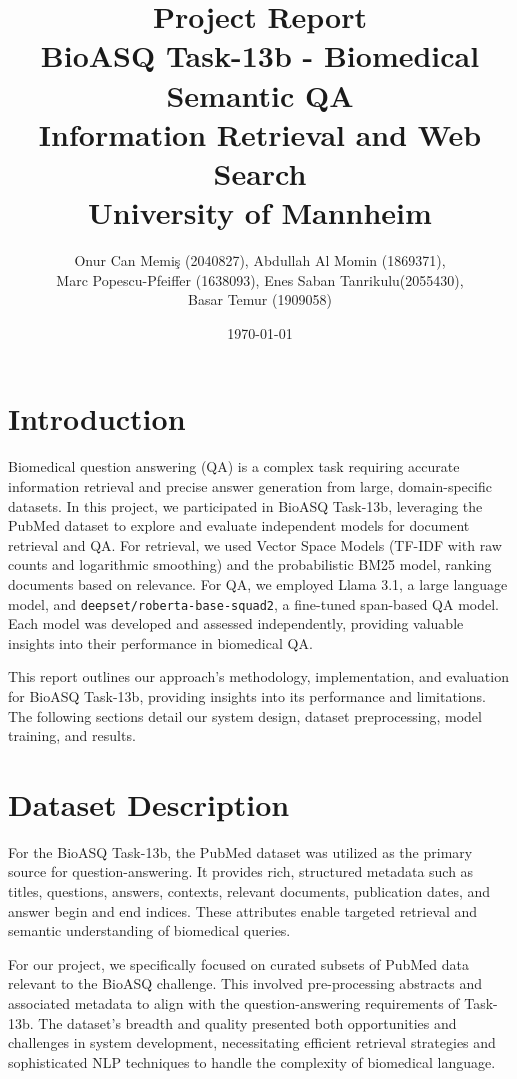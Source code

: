\documentclass{article}
\title{Project Report\\
BioASQ Task-13b - Biomedical Semantic QA\\
Information Retrieval and Web Search\\
\vspace{0.5cm}
University of Mannheim}
\author{Onur Can Memiş (2040827), Abdullah Al Momin (1869371),\\Marc Popescu-Pfeiffer (1638093), Enes Saban Tanrikulu(2055430),\\Basar Temur (1909058)}
\date{\today}
\begin{document}
\maketitle
\pagebreak
\tableofcontents

\pagebreak

\section{Introduction}
Biomedical question answering (QA) is a complex task requiring accurate information retrieval and precise answer generation from large, domain-specific datasets. In this project, we participated in BioASQ Task-13b, leveraging the PubMed dataset to explore and evaluate independent models for document retrieval and QA. For retrieval, we used Vector Space Models (TF-IDF with raw counts and logarithmic smoothing) and the probabilistic BM25 model, ranking documents based on relevance. For QA, we employed Llama 3.1, a large language model, and \texttt{deepset/roberta-base-squad2}, a fine-tuned span-based QA model. Each model was developed and assessed independently, providing valuable insights into their performance in biomedical QA.


This report outlines our approach's methodology, implementation, and evaluation for BioASQ Task-13b, providing insights into its performance and limitations. The following sections detail our system design, dataset preprocessing, model training, and results.

\section{Dataset Description}
For the BioASQ Task-13b, the PubMed dataset was utilized as the primary source for question-answering. It provides rich, structured metadata such as titles, questions, answers, contexts, relevant documents, publication dates, and answer begin and end indices. These attributes enable targeted retrieval and semantic understanding of biomedical queries.


For our project, we specifically focused on curated subsets of PubMed data relevant to the BioASQ challenge. This involved pre-processing abstracts and associated metadata to align with the question-answering requirements of Task-13b. The dataset’s breadth and quality presented both opportunities and challenges in system development, necessitating efficient retrieval strategies and sophisticated NLP techniques to handle the complexity of biomedical language.
\end{document}
